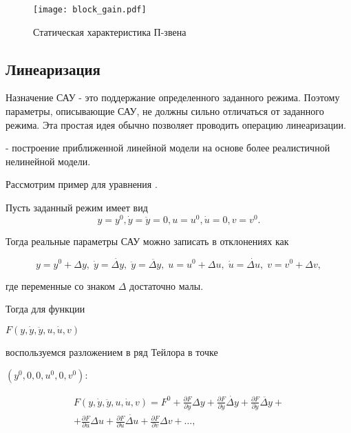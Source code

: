 \documentclass[../../TAU.tex]{subfiles}
\begin{document}
    \begin{figure}[h]
        \centering
        \texttt{[image: block\_gain.pdf]}
        \caption{Статическая характеристика П-звена}
        \centering
    \end{figure}



\subsection{Линеаризация} %

    Назначение САУ - это поддержание определенного заданного режима. Поэтому параметры, описывающие САУ, не должны сильно отличаться от заданного режима. Эта простая идея обычно позволяет проводить операцию линеаризации.

     - построение приближенной линейной модели на основе более реалистичной нелинейной модели.

    Рассмотрим пример для уравнения 
    .

    Пусть заданный режим имеет вид
    \begin{equation}
        y = y^0, \dot y = \ddot y = 0, u=u^0, \dot u = 0, v=v^0.
    \end{equation}
    
    Тогда реальные параметры САУ можно записать в отклонениях как
    
    \begin{equation}
        y = y^0+\Delta y,\;\dot y = \dot{\Delta y},\;\ddot y = \ddot{\Delta y},\; u = u^0 + \Delta u,\; \dot u = \dot{\Delta u},\;v = v^0 + \Delta v,
    \end{equation}
    
    где переменные со знаком $\Delta$ достаточно малы.

    Тогда для функции 
    
    $F(y,\dot y, \ddot y, u, \dot u, v)$ 

    воспользуемся разложением в ряд Тейлора в точке 

    $(y^0, 0,0, u^0, 0, v^0)$:
    
    \begin{multline}
        F(y,\dot y, \ddot y, u, \dot u, v) = F^0 + \frac{\partial F}{\partial y} \Delta y +\frac{\partial F}{\partial \dot y} \dot{\Delta y}+ \frac{\partial F}{\partial \ddot y} \ddot{\Delta y} +\\  + \frac{\partial F}{\partial u} \Delta u + \frac{\partial F}{\partial \dot u } \dot{\Delta u} + \frac{\partial F}{\partial v} \Delta v + \ldots,
    \end{multline}
\end{document}
